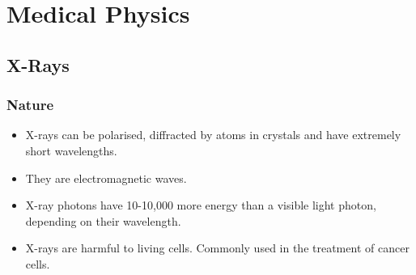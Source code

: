 \section{Medical Physics}

\subsection{X-Rays}

\subsubsection*{Nature}
\begin{itemize}
    \item X-rays can be polarised, diffracted by atoms in crystals and have extremely short wavelengths.
    \item They are electromagnetic waves.
    \item X-ray photons have 10-10,000 more energy than a visible light photon, depending on their wavelength.
    \item X-rays are harmful to living cells. Commonly used in the treatment of cancer cells.
\end{itemize}


